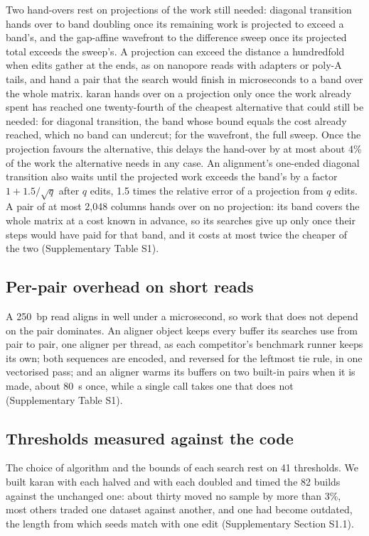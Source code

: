 Two hand-overs rest on projections of the work still needed: diagonal transition hands over to band doubling once its remaining work is projected to exceed a band's, and the gap-affine wavefront to the difference sweep once its projected total exceeds the sweep's. A projection can exceed the distance a hundredfold when edits gather at the ends, as on nanopore reads with adapters or poly-A tails, and hand a pair that the search would finish in microseconds to a band over the whole matrix. karan hands over on a projection only once the work already spent has reached one twenty-fourth of the cheapest alternative that could still be needed: for diagonal transition, the band whose bound equals the cost already reached, which no band can undercut; for the wavefront, the full sweep. Once the projection favours the alternative, this delays the hand-over by at most about 4\% of the work the alternative needs in any case. An alignment's one-ended diagonal transition also waits until the projected work exceeds the band's by a factor \(1 + 1.5/\sqrt{q}\) after \(q\) edits, 1.5 times the relative error of a projection from \(q\) edits. A pair of at most 2{,}048 columns hands over on no projection: its band covers the whole matrix at a cost known in advance, so its searches give up only once their steps would have paid for that band, and it costs at most twice the cheaper of the two (Supplementary Table S1).

\subsection{Per-pair overhead on short reads}

A 250~bp read aligns in well under a microsecond, so work that does not depend on the pair dominates. An aligner object keeps every buffer its searches use from pair to pair, one aligner per thread, as each competitor's benchmark runner keeps its own; both sequences are encoded, and reversed for the leftmost tie rule, in one vectorised pass; and an aligner warms its buffers on two built-in pairs when it is made, about 80~\textmu s once, while a single call takes one that does not (Supplementary Table S1).

\subsection{Thresholds measured against the code}

The choice of algorithm and the bounds of each search rest on 41 thresholds. We built karan with each halved and with each doubled and timed the 82 builds against the unchanged one: about thirty moved no sample by more than 3\%, most others traded one dataset against another, and one had become outdated, the length from which seeds match with one edit (Supplementary Section S1.1).

